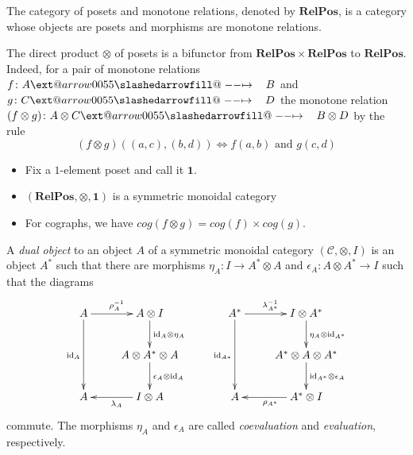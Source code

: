 \documentclass{beamer}
\makeatletter
\newcommand{\id}{\mathrm{id}}
\newcommand{\C}{\mathcal{C}}
\newcommand{\RelPos}{\mathbf{RelPos}}
\def\slashedarrowfill@#1#2#3#4#5{%
  $\m@th\thickmuskip0mu\medmuskip\thickmuskip\thinmuskip\thickmuskip
  \relax#5#1\mkern-7mu%
  \cleaders\hbox{$#5\mkern-2mu#2\mkern-2mu$}\hfill
  \mathclap{#3}\mathclap{#2}%
  \cleaders\hbox{$#5\mkern-2mu#2\mkern-2mu$}\hfill
  \mkern-7mu#4$%
}
\def\rightslashedarrowfill@{%
  \slashedarrowfill@\relbar\relbar\mapstochar\rightarrow}
\newcommand\xslashedrightarrow[2][]{%
  \ext@arrow 0055{\rightslashedarrowfill@}{#1}{#2}}
\newcommand{\sto}{\xslashedrightarrow{\hskip 1pc}}
\makeatother
\begin{document}
\begin{frame}
The category of posets and monotone relations, denoted by $\RelPos$, is a category
whose objects are posets and morphisms are monotone relations.

\end{frame}
\begin{frame}
The direct product $\otimes$ of posets is a bifunctor from
$\RelPos\times\RelPos$ to $\RelPos$. Indeed, for a pair of monotone relations
$f\colon A\sto B$ and $g\colon C\sto D$ the monotone relation $(f\otimes g)\colon
A\otimes C\sto B\otimes D$ by the rule
$$
(f\otimes g)((a,c),(b,d)) \Leftrightarrow f(a,b)\text{ and }g(c,d)
$$
\end{frame}
\begin{frame}
\begin{itemize}
\item 
Fix a $1$-element poset and call it $\mathbf 1$.
\item
$(\RelPos,\otimes,\mathbf 1)$ is a symmetric
monoidal category
\item For cographs, we have $cog(f\otimes g)=cog(f)\times cog(g)$.
\end{itemize}

\end{frame}
\begin{frame}

A {\em dual object} to an object $A$ of a symmetric monoidal category $(\C,\otimes,I)$ is an object
$A^*$ such that there are morphisms
$\eta_A\colon I\to A^*\otimes A$ and $\epsilon_A\colon A\otimes A^*\to I$ such
that the diagrams
\begin{equation}
\label{diag:compact}
\xymatrix{
A
	\ar[r]^{\rho_A^{-1}}
	\ar[dd]_{\id_A}
&
A\otimes I
	\ar[d]^{\id_A\otimes\eta_A}
\\
~
&
A\otimes A^*\otimes A
	\ar[d]^{\epsilon_A\otimes\id_A}
\\
A
&
I\otimes A
	\ar[l]^{\lambda_A}
}
\qquad
\xymatrix{
A^*
	\ar[r]^{\lambda_{A^*}^{-1}}
	\ar[dd]_{\id_{A*}}
&
I\otimes A^*
	\ar[d]^{\eta_A\otimes\id_{A^*}}
\\
~
&
A^*\otimes A\otimes A^*
	\ar[d]^{\id_{A^*}\otimes\epsilon_A}
\\
A
&
A^*\otimes I
	\ar[l]^{\rho_{A^*}}
}
\end{equation}
commute. The morphisms $\eta_A$ and $\epsilon_A$ are called {\em coevaluation} and
{\em evaluation}, respectively. 
\end{frame}
\end{document}
